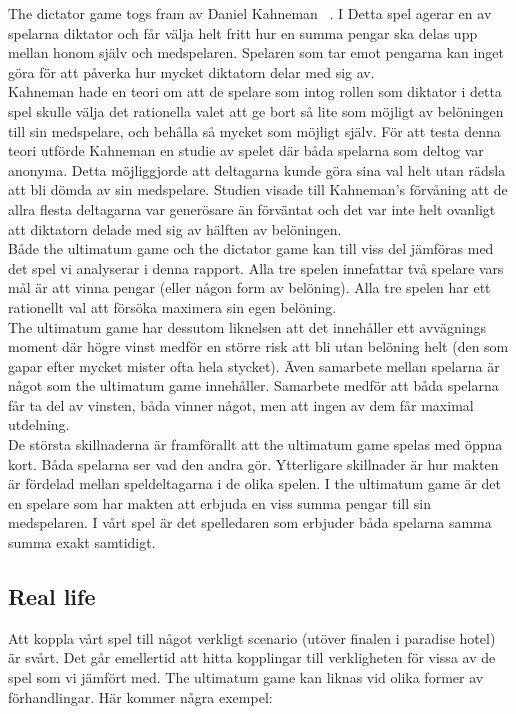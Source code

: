 \noindent The dictator game togs fram av Daniel Kahneman ~\cite{Kahneman:1986}. I Detta spel agerar en av spelarna diktator och får välja helt fritt hur en summa pengar ska delas upp mellan honom själv och medspelaren. Spelaren som tar emot pengarna kan inget göra för att påverka hur mycket diktatorn delar med sig av. \\

\noindent Kahneman hade en teori om att de spelare som intog rollen som diktator i detta spel skulle välja det rationella valet att ge bort så lite som möjligt av belöningen till sin medspelare, och behålla så mycket som möjligt själv. För att testa denna teori utförde Kahneman en studie av spelet där båda  spelarna som deltog var anonyma. Detta möjliggjorde att deltagarna kunde göra sina val helt utan rädsla att bli dömda av sin medspelare. Studien visade till Kahneman’s förvåning att de allra flesta deltagarna var generösare än förväntat och det var inte helt ovanligt att diktatorn delade med sig av hälften av belöningen.\\

\noindent Både the ultimatum game och the dictator game kan till viss del jämföras med det spel vi analyserar i denna rapport. Alla tre spelen innefattar två spelare vars mål är att vinna pengar (eller någon form av belöning). Alla tre spelen har ett rationellt val att försöka maximera sin egen belöning.\\

\noindent The ultimatum game har dessutom liknelsen att det innehåller ett avvägnings moment där högre vinst medför en större risk att bli utan belöning helt (den som gapar efter mycket mister ofta hela stycket). Även samarbete mellan spelarna är något som the ultimatum game innehåller. Samarbete medför att båda spelarna får ta del av vinsten, båda vinner något, men att ingen av dem får maximal utdelning.\\

\noindent De största skillnaderna är framförallt att the ultimatum game spelas med öppna kort. Båda spelarna ser vad den andra gör. Ytterligare skillnader är hur makten är fördelad mellan speldeltagarna i de olika spelen. I the ultimatum game är det en spelare som har makten att erbjuda en viss summa pengar till sin medspelaren. I vårt spel är det spelledaren som erbjuder båda spelarna samma summa exakt samtidigt.\\

\subsection{Real life}
\noindent Att koppla vårt spel till något verkligt scenario (utöver finalen i paradise hotel) är svårt. Det går emellertid att hitta kopplingar till verkligheten för vissa av de spel som vi jämfört med. The ultimatum game kan liknas vid olika former av förhandlingar. Här kommer några exempel:~\cite{UltimatumGame}

